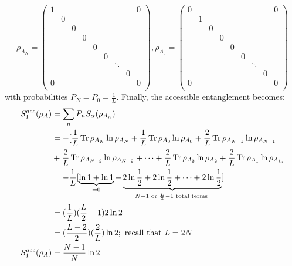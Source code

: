 \begin{equation}
\rho_{A_N} = \begin{pmatrix} 
1 & & & & & & & & 0 \\
& 0 \\
& & 0  \\
& & & 0 \\
& & & &  0 \\
& & & & & 0 \\
& & & & &  & \ddots \\
& & & & & & &  0 \\
0 & & & & & & & &  0 \\
\end{pmatrix} ,
\rho_{A_0} = \begin{pmatrix} 
0 & & & & & & & & 0 \\
& 1 \\
& & 0  \\
& & & 0 \\
& & & &  0 \\
& & & & & 0 \\
& & & & &  & \ddots \\
& & & & & & &  0 \\
0 & & & & & & & &  0 \\
\end{pmatrix} 
\end{equation}
%
with probabilities $P_{N} = P_{0} = \frac{1}{L}$. Finally, the accessible entanglement becomes:
%
\begin{align} 
S_{1}^{acc}(\rho_A) &= \sum_{n} P_n S_{\alpha}(\rho_{A_n}) \nonumber \\
&= -[\frac{1}{L} \operatorname{Tr}{\rho_{A_N} \ln{\rho_{A_N}}} + \frac{1}{L} \operatorname{Tr}{\rho_{A_0} \ln{\rho_{A_0}}} + \frac{2}{L} \operatorname{Tr}{\rho_{A_{N-1}} \ln{\rho_{A_{N-1}}}} \nonumber \\
&+\frac{2}{L} \operatorname{Tr}{\rho_{A_{N-2}} \ln{\rho_{A_{N-2}}}} + \dots +\frac{2}{L} \operatorname{Tr}{\rho_{A_{2}} \ln{\rho_{A_{2}}}} + \frac{2}{L} \operatorname{Tr}{\rho_{A_{1}} \ln{\rho_{A_{1}}}} ] \nonumber \\
&= -\frac{1}{L} [ \underbrace{\ln{1} + \ln{1}}_{=0} + \underbrace{2\ln{\frac{1}{2}} + 2\ln{\frac{1}{2}} + \dots + 2\ln{\frac{1}{2}}}_{N - 1 \text{ or } \frac{L}{2}-1\text{ total terms }}] \\
&= (\frac{1}{L})  (\frac{L}{2}-1) 2 \ln{2} \nonumber \\
&= (\frac{L-2}{2})(\frac{2}{L})\ln{2} ; \text{ recall that } L = 2N \nonumber \\
S_{1}^{acc}(\rho_A) &= \frac{N-1}{N}\ln{2}
\end{align}
%
